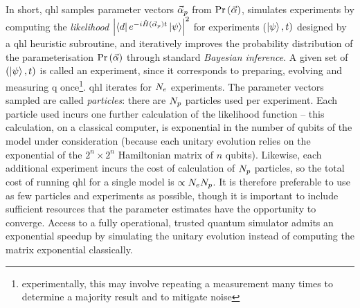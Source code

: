 In short, \gls{qhl} samples parameter vectors $\vec{\alpha}_p$ from $\Pr\left(\vec{\alpha}\right)$, 
    simulates experiments by computing the \emph{likelihood} $\left| \bra{d} e^{-i \hat{H}(\vec{\alpha}_p)t} \ket{\psi} \right|^2$
    for experiments ($\ket{\psi}, t)$ designed by a \gls{qhl} heuristic subroutine, 
    and iteratively improves the probability distribution of the parameterisation $\Pr\left(\vec{\alpha}\right)$ 
    through standard \emph{Bayesian inference}. 
A given set of $(\ket{\psi}, t)$ is called an experiment, since it corresponds to preparing, evolving and measuring \gls{q} 
once\footnote{experimentally, this may involve repeating a measurement many times to determine a majority result and to mitigate noise}. 
\gls{qhl} iterates for $N_e$ experiments. 
The parameter vectors sampled are called \emph{particles}: there are $N_p$ particles used per experiment. 
Each particle used incurs one further calculation of the likelihood function -- 
    this calculation, on a classical computer, is exponential in the number of qubits of the model under consideration
    (because each unitary evolution relies on the exponential of the $2^n \times 2^n$ Hamiltonian matrix of $n$ qubits). 
Likewise, each additional experiment incurs the cost of calculation of $N_p$ particles, 
    so the total cost of running \gls{qhl} for a single model is $\propto N_e N_p$.
It is therefore preferable to use as few particles and experiments as possible, 
    though it is important to include sufficient resources that the parameter estimates have the opportunity to converge. 
Access to a fully operational, trusted quantum simulator admits an exponential 
    speedup by simulating the unitary evolution instead of computing the matrix exponential classically.
\par 

